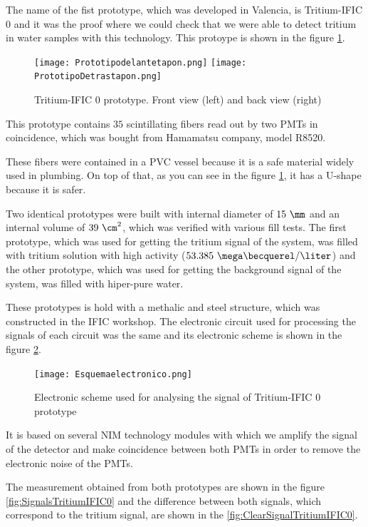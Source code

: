 The name of the fist prototype, which was developed in Valencia, is Tritium-IFIC 0 and it was the proof where we could check that we were able to detect tritium in water samples with this technology. This protoype is shown in the figure \ref{fig:Tritium_IFIC_0}.

\begin{figure}[htb]
\centering
{
\texttt{[image: Prototipodelantetapon.png]} 
}
{
\texttt{[image: PrototipoDetrastapon.png]} 
}
\caption{Tritium-IFIC 0 prototype. Front view (left) and back view (right) \label{fig:Tritium_IFIC_0}}
\end{figure} 

This prototype contains $35$ scintillating fibers read out by two PMTs in coincidence, which was bought from Hamamatsu company, model R8520. 

These fibers were contained in a PVC vessel because it is a safe material widely used in plumbing. On top of that, as you can see in the figure \ref{fig:Tritium_IFIC_0}, it has a U-shape because it is safer. 

Two identical prototypes were built with internal diameter of $15~\mm $ and an internal volume of $39~\cm^2$, which was verified with various fill tests. The first prototype, which was used for getting the tritium signal of the system, was filled with tritium solution with high activity ($53.385~\mega\becquerel/\liter$) and the other prototype, which was used for getting the background signal of the system, was filled with hiper-pure water. 

These prototypes is hold with a methalic and steel structure, which was constructed in the IFIC workshop. The electronic circuit used for processing the signals of each circuit was the same and its electronic scheme is shown in the figure \ref{fig:Electronic_scheme}.

\begin{figure}[htb]
\centering
{
\texttt{[image: Esquemaelectronico.png]} 
}
\caption{Electronic scheme used for analysing the signal of Tritium-IFIC 0 prototype \label{fig:Electronic_scheme}}
\end{figure} 

It is based on several NIM technology modules with which we amplify the signal of the detector and make coincidence between both PMTs in order to remove the electronic noise of the PMTs. 

The measurement obtained from both prototypes are shown in the figure \ref{fig:SignalsTritiumIFIC0} and the difference between both signals, which correspond to the tritium signal, are shown in the \ref{fig:ClearSignalTritiumIFIC0}. 

